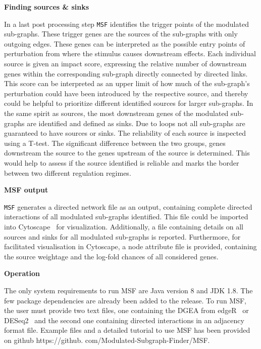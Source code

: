 \documentclass[10pt,a4paper,twocolumn]{article}
\newcommand{\DONE}[1]{\begingroup\color{blue}#1\endgroup}
\begin{document}
	\textbf{Finding sources \& sinks}
	
	In a last post processing step \texttt{MSF} identifies the
        trigger points of the modulated sub-graphs. These trigger
        genes are the sources of the sub-graphs with only outgoing
        edges. These genes can be interpreted as the possible entry
        points of perturbation from where the stimulus causes
        downstream effects. Each individual source is given an impact
        score, expressing the relative number of downstream genes
          within the corresponding sub-graph directly connected by
          directed links. This score can be interpreted as an upper
          limit of how much of the sub-graph's perturbation could have
          been introduced by the respective source, and thereby could
          be helpful to prioritize different identified sources for
          larger sub-graphs. In the same
        spirit as sources, the most downstream genes of the
        modulated sub-graphs are identified and defined as sinks. Due
        to loops not all sub-graphs are guaranteed to have sources or
        sinks. The reliability of each source is inspected using a T-test. The significant difference between the two groups, genes downstream the source to the genes upstream of the source is determined. This would help to assess if the source identified is reliable and marks the border between two different regulation regimes.
	
	
	\textbf{MSF output}
	
	\texttt{MSF} generates a directed network file as an output,
        containing complete directed interactions of all modulated
        sub-graphs identified. This file could be imported into
        Cytoscape~\cite{Cyto} for visualization. Additionally, a
          file containing details on all sources and sinks for all
          modulated sub-graphs is reported. Furthermore, for
          facilitated visualisation in Cytoscape, a node attribute
          file is provided, containing the source weightage and the
          log-fold chances of all considered genes.
	
	\textbf{Operation}
	
	\DONE{The only system requirements to run MSF are Java version 8 and JDK 1.8. The few package
		dependencies are already been added to the release. To run
		MSF, the user must provide two text files, one containing the
		DGEA from edgeR~\cite{edgeR} or DESeq2~\cite{love2014moderated}} and  the second one containing
        directed interactions in an adjacency format file. Example
        files and a detailed tutorial to use MSF has been provided on
        github https://github. com/Modulated-Subgraph-Finder/MSF.
	
\end{document}
